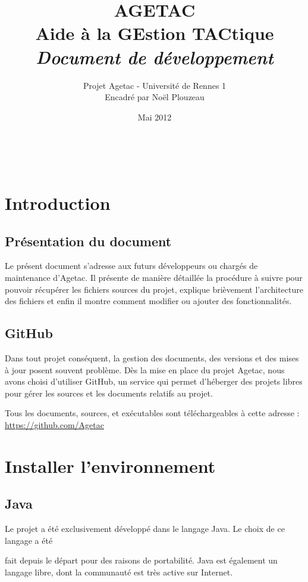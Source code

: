 \documentclass{article}
\title{\Huge{AGETAC\\
Aide à la GEstion TACtique\\}
\huge{{\color{color02} \textit{Document de développement}}}}
\date{Mai 2012}
\author{Projet Agetac - Université de Rennes 1\\
Encadré par Noël Plouzeau}
\begin{document}
\vspace{0.5in}
\maketitle
\newpage
$~$
\vspace{0.5in}
\tableofcontents
\newpage
\section{Introduction}

\subsection{Présentation du document}

Le présent document s'adresse aux futurs développeurs ou chargés de maintenance d’Agetac. Il présente de manière détaillée la procédure à suivre pour pouvoir récupérer les fichiers sources du projet, explique brièvement l'architecture des fichiers et enfin il montre comment modifier ou ajouter des fonctionnalités.

\subsection{GitHub}

Dans tout projet conséquent, la gestion des documents, des versions et des mises à jour posent souvent problème. Dès la mise en place du projet Agetac, nous avons choisi d'utiliser GitHub, un service qui permet d'héberger des projets libres pour gérer les sources et les documents relatifs au projet.

Tous les documents, sources, et exécutables sont téléchargeables à cette adresse :\\ \url{https://github.com/Agetac}

\section{Installer l'environnement}


\subsection{Java}

Le projet a été exclusivement développé dans le langage Java. Le choix de ce langage a été

fait depuis le départ pour des raisons de portabilité. Java est également un langage libre, dont la communauté est très active sur Internet.
\end{document}
